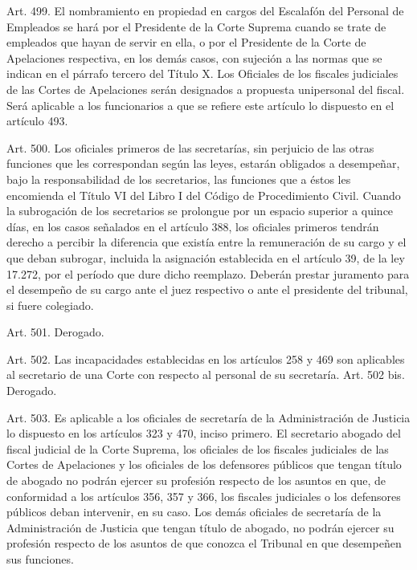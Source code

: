     Art. 499. El nombramiento en propiedad en cargos del Escalafón del Personal de Empleados se hará por el Presidente de la Corte Suprema cuando se trate de empleados que hayan de servir en ella, o por el Presidente de la Corte de Apelaciones respectiva, en los demás casos, con sujeción a las normas que se indican en el párrafo tercero del Título X.
    Los Oficiales de los fiscales judiciales de las Cortes de Apelaciones serán designados a propuesta unipersonal del fiscal.
    Será aplicable a los funcionarios a que se refiere este artículo lo dispuesto en el artículo 493.



    Art. 500. Los oficiales primeros de las secretarías, sin perjuicio de las otras funciones que les correspondan según las leyes, estarán obligados a desempeñar, bajo la responsabilidad de los secretarios, las funciones que a éstos les encomienda el Título VI del Libro I del Código de Procedimiento Civil.
    Cuando la subrogación de los secretarios se prolongue por un espacio superior a quince días, en los casos señalados en el artículo 388, los oficiales primeros tendrán derecho a percibir la diferencia que existía entre la remuneración de su cargo y el que deban subrogar, incluida la asignación establecida en el artículo 39, de la ley 17.272, por el período que dure dicho reemplazo.
    Deberán prestar juramento para el desempeño de su cargo ante el juez respectivo o ante el presidente del tribunal, si fuere colegiado.

    Art. 501. Derogado.


    Art. 502. Las incapacidades establecidas en los artículos 258 y 469 son aplicables al secretario de una Corte con respecto al personal de su secretaría.
    Art. 502 bis. Derogado.



    Art. 503. Es aplicable a los oficiales de secretaría de la Administración de Justicia lo dispuesto en los artículos 323 y 470, inciso primero.
    El secretario abogado del fiscal judicial de la Corte Suprema, los oficiales de los fiscales judiciales de las Cortes de Apelaciones y los oficiales de los defensores públicos que tengan título de abogado no podrán ejercer su profesión respecto de los asuntos en que, de conformidad a los artículos 356, 357 y 366, los fiscales judiciales o los defensores públicos deban intervenir, en su caso.
    Los demás oficiales de secretaría de la Administración de Justicia que tengan título de abogado, no podrán ejercer su profesión respecto de los asuntos de que conozca el Tribunal en que desempeñen sus funciones.




